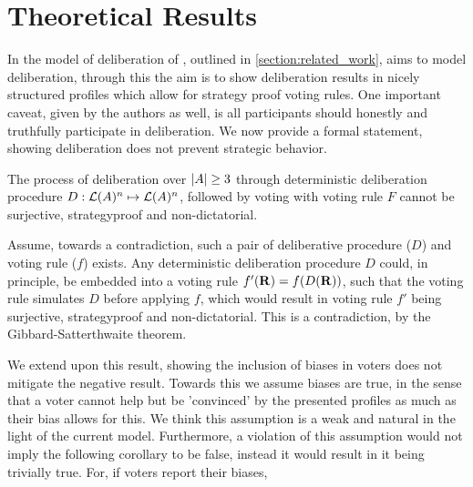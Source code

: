 \newpage
\chapter{Theoretical Results}
\label{theory}


In the model of deliberation of \citet{radDeliberationSinglePeakednessCoherent2021a}, outlined in \cref{section:related_work}, aims to model deliberation, through this the aim is to show deliberation results in nicely structured profiles which allow for strategy proof voting rules. One important caveat, given by the authors as well, is all participants should honestly and truthfully participate in deliberation. We now provide a formal statement, showing deliberation does not prevent strategic behavior.

\begin{proposition}
	The process of deliberation over $|A| \geq 3$ through deterministic deliberation procedure \({D}: \mathcal{L}(A)^n \mapsto \mathcal{L}(A)^n\), followed by voting with voting rule $F$ cannot be surjective, strategyproof and non-dictatorial.

	\label{proposition:deterministic-delib}
\end{proposition}

\begin{proofc}
	Assume, towards a contradiction, such a pair of deliberative procedure ($D$) and voting rule (\(f\)) exists. Any deterministic deliberation procedure $D$ could, in principle, be embedded into a voting rule $f'(\mathbf{R}) = f(D(\mathbf{R}))$, such that the voting rule simulates $D$ before applying $f$, which would result in  voting rule $f'$ being surjective, strategyproof and non-dictatorial. This is a contradiction, by the Gibbard-Satterthwaite theorem\citep{gibbardManipulationVotingSchemes1973,satterthwaiteStrategyproofnessArrowsConditions1975}.
\end{proofc}


We extend upon this result, showing the inclusion of biases in voters does not mitigate the negative result. Towards this we assume biases are true, in the sense that a voter cannot help but be 'convinced' by the presented profiles as much as their bias allows for this. We think this assumption is a weak and natural in the light of the current model. Furthermore, a violation of this assumption would not imply the following corollary to be false, instead it would result in it being trivially true. For, if voters report their biases,


